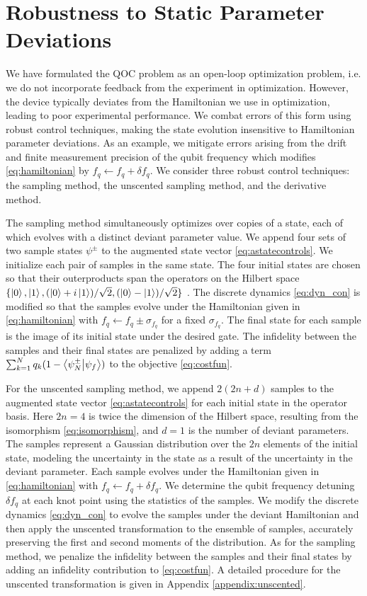 \section{Robustness to Static Parameter Deviations \label{sec:static}}
We have formulated the QOC
problem as an open-loop optimization problem, i.e.
we do not incorporate feedback from the experiment in optimization.
However, the device typically deviates from the Hamiltonian we use in optimization,
leading to poor experimental performance. We combat errors
of this form using robust control techniques,
making the state evolution insensitive
to Hamiltonian parameter deviations. As an example,
we mitigate errors arising from the drift and finite measurement
precision of the qubit frequency which modifies \eqref{eq:hamiltonian}
by $f_{q} \gets f_{q} + \delta f_{q}$.
We consider three robust control techniques:
the sampling method, the unscented sampling method,
and the derivative method.

The sampling method simultaneously optimizes over copies of a state,
each of which evolves with a distinct deviant parameter value.
We append four sets of two sample states $\psi^{\pm}$
to the augmented state vector \eqref{eq:astatecontrols}.
We initialize each pair of samples in the same state.
The four initial states are chosen so that their outerproducts
span the operators on the Hilbert space
$\{\ket{0}, \ket{1}, (\ket{0} + i\ket{1}) / \sqrt{2},
(\ket{0} - \ket{1}) / \sqrt{2}\}$ \cite{chow2009randomized}.
The discrete dynamics \eqref{eq:dyn_con} is modified so that the
samples evolve under the Hamiltonian given in \eqref{eq:hamiltonian}
with $f_{q} \gets f_{q} \pm \sigma_{f_{q}}$ for a fixed $\sigma_{f_{q}}$.
The final state
for each sample is the image of its initial state
under the desired gate. The infidelity between
the samples and their final states are penalized
by adding a term $\sum_{k=1}^{N} q_{k} (1 - \braket{\psi^{\pm}_{N}}{\psi_{f}})$
to the objective \eqref{eq:costfun}.

For the unscented sampling method, we append $2(2n + d)$ samples
to the augmented state vector \eqref{eq:astatecontrols}
for each initial state in the operator basis. Here $2n = 4$ is twice the
dimension of the Hilbert space, resulting from the isomorphism \eqref{eq:isomorphism},
and $d = 1$ is the number of deviant parameters. The samples
represent a Gaussian distribution over the $2n$
elements of the initial state, modeling
the uncertainty in the state as a result of the uncertainty in
the deviant parameter. Each sample evolves under the Hamiltonian
given in \eqref{eq:hamiltonian} with $f_{q} \gets f_{q} + \delta f_{q}$.
We determine the qubit frequency detuning $\delta f_{q}$
at each knot point using the statistics of the samples.
We modify the discrete dynamics \eqref{eq:dyn_con} to
evolve the samples under the deviant Hamiltonian
and then apply the unscented transformation to the ensemble
of samples,
accurately preserving the first and second moments
of the distribution.
As for the sampling method,
we penalize the infidelity between the samples and their final states
by adding an infidelity contribution to \eqref{eq:costfun}.
A detailed procedure for the unscented transformation is given
in Appendix \ref{appendix:unscented}.

